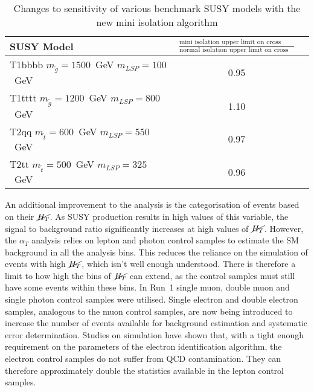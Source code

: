 \\\\
\begin{table}[h!]
  \caption{Changes to sensitivity of various benchmark SUSY models with the new mini isolation algorithm \label{tab:miniIsoResult}}
  \centering
  \footnotesize
  \begin{tabular}{ lcc }
    \hline
    \hline
    SUSY Model     & $\frac{\textrm{mini isolation upper limit on cross section}}{\textrm{normal isolation upper limit on cross section}}$\\ 
    \hline                                                                     
    T1bbbb $m_{\tilde{g}}=1500$~GeV $m_{LSP}=100$~GeV     & 0.95    \\  %
    T1tttt $m_{\tilde{g}}=1200$~GeV $m_{LSP}=800$~GeV      & 1.10    \\  %
    T2qq $m_{\tilde{t}}=600$~GeV $m_{LSP}=550$~GeV      & 0.97    \\  %
    T2tt $m_{\tilde{t}}=500$~GeV $m_{LSP}=325$~GeV       & 0.96    \\  %
    \hline
    \hline
  \end{tabular}
\end{table}

\noindent An additional improvement to the analysis is the categorisation of events based on their $\cancel{H_T}$. As SUSY production results in high values of this variable, the signal to background ratio significantly increases at high values of $\cancel{H_T}$. However, the $\alpha_T$ analysis relies on lepton and photon control samples to estimate the SM background in all the analysis bins. This reduces the reliance on the simulation of events with high $\cancel{H_T}$, which isn't well enough understood. There is therefore a limit to how high the bins of $\cancel{H_T}$ can extend, as the control samples must still have some events within these bins. In Run~1 single muon, double muon and single photon control samples were utilised. Single electron and double electron samples, analogous to the muon control samples, are now being introduced to increase the number of events available for background estimation and systematic error determination. Studies on simulation have shown that, with a tight enough requirement on the parameters of the electron identification algorithm, the electron control samples do not suffer from QCD contamination. They can therefore approximately double the statistics available in the lepton control samples.
